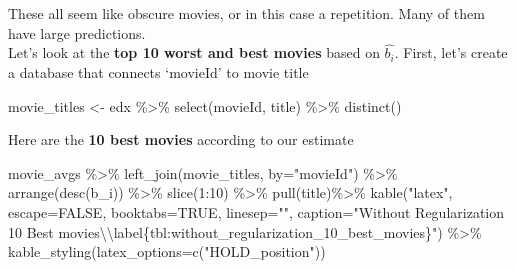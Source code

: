 \documentclass[
]{article}
\newenvironment{Shaded}{}{}
\newcommand{\AttributeTok}[1]{\textcolor[rgb]{0.49,0.56,0.16}{#1}}
\newcommand{\ConstantTok}[1]{\textcolor[rgb]{0.53,0.00,0.00}{#1}}
\newcommand{\DecValTok}[1]{\textcolor[rgb]{0.25,0.63,0.44}{#1}}
\newcommand{\FunctionTok}[1]{\textcolor[rgb]{0.02,0.16,0.49}{#1}}
\newcommand{\NormalTok}[1]{#1}
\newcommand{\OtherTok}[1]{\textcolor[rgb]{0.00,0.44,0.13}{#1}}
\newcommand{\SpecialCharTok}[1]{\textcolor[rgb]{0.25,0.44,0.63}{#1}}
\newcommand{\StringTok}[1]{\textcolor[rgb]{0.25,0.44,0.63}{#1}}
\begin{document}
These all seem like obscure movies, or in this case a repetition. Many
of them have large predictions.\\
Let's look at the \textbf{top 10 worst and best movies} based on
\(\hat{b_{i}}\). First, let's create a database that connects `movieId'
to movie title

\begin{Shaded}
\begin{Highlighting}[]
\NormalTok{movie\_titles }\OtherTok{\textless{}{-}}\NormalTok{ edx }\SpecialCharTok{\%\textgreater{}\%} 
  \FunctionTok{select}\NormalTok{(movieId, title) }\SpecialCharTok{\%\textgreater{}\%}
  \FunctionTok{distinct}\NormalTok{()}
\end{Highlighting}
\end{Shaded}

Here are the \textbf{10 best movies} according to our estimate

\begin{Shaded}
\begin{Highlighting}[]
\NormalTok{movie\_avgs }\SpecialCharTok{\%\textgreater{}\%} \FunctionTok{left\_join}\NormalTok{(movie\_titles, }\AttributeTok{by=}\StringTok{"movieId"}\NormalTok{) }\SpecialCharTok{\%\textgreater{}\%}
  \FunctionTok{arrange}\NormalTok{(}\FunctionTok{desc}\NormalTok{(b\_i)) }\SpecialCharTok{\%\textgreater{}\%} 
  \FunctionTok{slice}\NormalTok{(}\DecValTok{1}\SpecialCharTok{:}\DecValTok{10}\NormalTok{)  }\SpecialCharTok{\%\textgreater{}\%} 
  \FunctionTok{pull}\NormalTok{(title)}\SpecialCharTok{\%\textgreater{}\%} 
  \FunctionTok{kable}\NormalTok{(}\StringTok{"latex"}\NormalTok{, }\AttributeTok{escape=}\ConstantTok{FALSE}\NormalTok{, }\AttributeTok{booktabs=}\ConstantTok{TRUE}\NormalTok{, }\AttributeTok{linesep=}\StringTok{""}\NormalTok{, }\AttributeTok{caption=}\StringTok{"Without Regularization 10 Best movies}\SpecialCharTok{\textbackslash{}\textbackslash{}}\StringTok{label\{tbl:without\_regularization\_10\_best\_movies\}"}\NormalTok{) }\SpecialCharTok{\%\textgreater{}\%}
    \FunctionTok{kable\_styling}\NormalTok{(}\AttributeTok{latex\_options=}\FunctionTok{c}\NormalTok{(}\StringTok{"HOLD\_position"}\NormalTok{))}
\end{Highlighting}
\end{Shaded}
\end{document}
